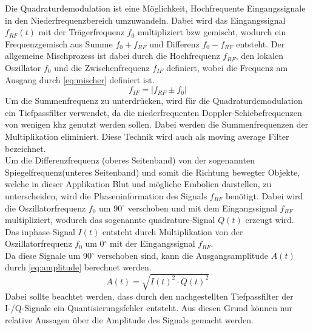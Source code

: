 Die Quadraturdemodulation ist eine Möglichkeit, Hochfrequente Eingangssignale in den Niederfrequenzbereich umzuwandeln. Dabei wird das Eingangssignal \(f_{RF}(t)\) mit der Trägerfrequenz \(f_0\) multipliziert \ac{bzw} gemischt, wodurch ein Frequenzgemisch aus Summe \(f_0+f_{RF}\) und Differenz \(f_0-f_{RF}\) entsteht. Der allgemeine Mischprozess ist dabei durch die Hochfrequenz \(f_{RF}\), den lokalen Oszillator \(f_{0}\) und die Zwischenfrequenz \(f_{IF}\) definiert, wobei die Frequenz am Ausgang durch \autoref{eq:mischer} definiert ist.\cite[S. 2 f.]{mischer} 
\begin{equation}
f_{IF}=\vert f_{RF}\pm f_{0}\vert\label{eq:mischer}
\end{equation}
Um die Summenfrequenz zu unterdrücken, wird für die Quadraturdemodulation ein Tiefpassfilter verwendet, da die niederfrequenten Doppler-Schiebefrequenzen von wenigen \ac{khz} genutzt werden sollen. Dabei werden die Summenfrequenzen der Multiplikation eliminiert. Diese Technik wird auch als moving average Filter bezeichnet.\\
Um die Differenzfrequenz (oberes Seitenband) von der sogenannten Spiegelfrequenz\cite[S. 3]{mischer}(unteres Seitenband) und somit die Richtung bewegter Objekte, welche in dieser Applikation Blut und mögliche Embolien darstellen, zu unterscheiden, wird die Phaseninformation des Signals \(f_{RF}\) benötigt. Dabei wird die Oszillatorfrequenz \(f_{0}\) um 90$^\circ$ verschoben und mit dem Eingangssignal \(f_{RF}\) multipliziert, wodurch das sogenannte quadrature-Signal $Q(t)$ erzeugt wird. Das inphase-Signal $I(t)$ entsteht durch Multiplikation von der Oszillatorfrequenz \(f_{0}\) um 0$^\circ$ mit der Eingangssignal \(f_{RF}\). \\
Da diese Signale um 90$^\circ$ verschoben sind, kann die Ausgangsamplitude $A(t)$ durch \autoref{eq:amplitude} berechnet werden.
\[A(t) = \sqrt{I(t)^2\cdot Q(t)^2}\]\label{eq:amplitude}
Dabei sollte beachtet werden, dass durch den nachgestellten Tiefpassfilter der I-/Q-Signale ein Quantisierungsfehler entsteht. Aus diesen Grund können nur relative Aussagen über die Amplitude des Signals gemacht werden.
